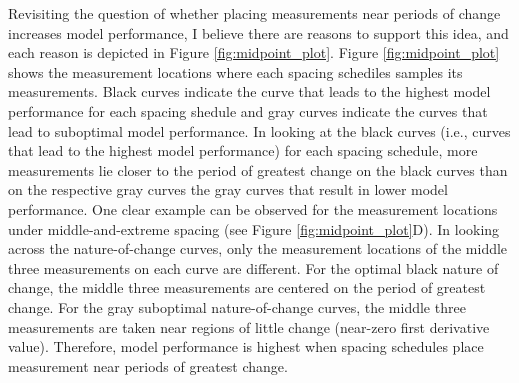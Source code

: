 \documentclass[
12pt, %
twoside,
english]{guelphthesis}
\begin{document}
Revisiting the question of whether placing measurements near periods of change increases model performance, I believe there are reasons to support this idea, and each reason is depicted in Figure \ref{fig:midpoint_plot}. Figure \ref{fig:midpoint_plot} shows the measurement locations where each spacing schediles samples its measurements. Black curves indicate the curve that leads to the highest model performance for each spacing shedule and gray curves indicate the curves that lead to suboptimal model performance. In looking at the black curves (i.e., curves that lead to the highest model performance) for each spacing schedule, more measurements lie closer to the period of greatest change on the black curves than on the respective gray curves the gray curves that result in lower model performance. One clear example can be observed for the measurement locations under middle-and-extreme spacing (see Figure \ref{fig:midpoint_plot}D). In looking across the nature-of-change curves, only the measurement locations of the middle three measurements on each curve are different. For the optimal black nature of change, the middle three measurements are centered on the period of greatest change. For the gray suboptimal nature-of-change curves, the middle three measurements are taken near regions of little change (near-zero first derivative value). Therefore, model performance is highest when spacing schedules place measurement near periods of greatest change.
\end{document}
